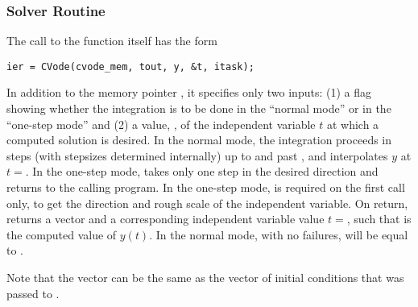 \subsubsection{{\cvode} Solver Routine}\label{sss:cvode}

The call to the  function itself has the form
\begin{verbatim}
ier = CVode(cvode_mem, tout, y, &t, itask);
\end{verbatim}
In addition to the {\cvode} memory pointer , it specifies only two
inputs: (1) a flag  showing whether the integration is to be done in
the ``normal mode'' or in the ``one-step mode'' and (2) a value,
, of the independent variable $t$ at which a computed
solution is desired.  In the normal mode, the integration proceeds in
steps (with stepsizes determined internally) up to and past ,
and  interpolates $y$ at $t = $. In the one-step
mode,  takes only one step in the desired direction and
returns to the calling program.  In the one-step mode,  is
required on the first call only, to get the direction and rough scale
of the independent variable.  On return,  returns a vector
 and a corresponding independent variable value
$t=$, such that  is the computed value of $y(t)$.
In the normal mode, with no failures,  will be equal to
.

Note that the vector  can be the same as the  vector of 
initial conditions that was passed to . 

